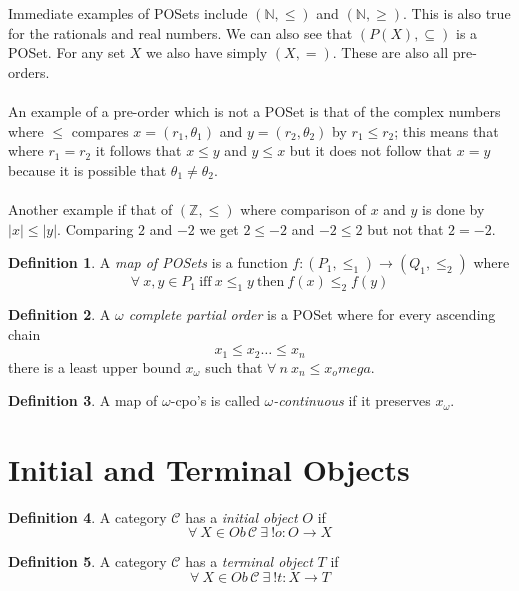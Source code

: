 \documentclass{article}
\theoremstyle{definition}
\newtheorem{definition}{Definition}[section]
\begin{document}
Immediate examples of POSets include $(\mathbb{N},\leq)$ and $(\mathbb{N},\geq)$.
This is also true for the rationals and real numbers.
We can also see that $(P(X), \subseteq)$ is a POSet.
For any set $X$ we also have simply $(X,=)$.
These are also all pre-orders.
\\ \\
An example of a pre-order which is not a POSet is that of the complex numbers
where $\leq$ compares $x = (r_1,\theta_1)$ and $y = (r_2,\theta_2)$ by $r_1 \leq r_2$;
this means that where $r_1 = r_2$ it follows that $x \leq y$ and $y \leq x$
but it does not follow that $x = y$ because it is possible that $\theta_1 \neq \theta_2$.
\\ \\
Another example if that of $(\mathbb{Z},\leq)$ where comparison of $x$ and $y$ is done by
$|x| \leq |y|$.
Comparing $2$ and $-2$ we get $2 \leq -2$ and $-2 \leq 2$ but not that $2 = -2$.

\begin{definition}
	A \textit{map of POSets} is a function $f : (P_1,\leq_1) \rightarrow (Q_1,\leq_2)$ where
	$$\forall\ x,y \in P_1\ \textrm{iff}\ x \leq_1 y\ \textrm{then}\ f(x) \leq_2 f(y)$$
\end{definition}

\begin{definition}
	A \textit{$\omega$ complete partial order} is a POSet where for every ascending chain
	$$x_1 \leq x_2 \dots \leq x_n$$
	there is a least upper bound $x_\omega$ such that $\forall\ n\ x_n \leq x_omega$.
\end{definition}

\begin{definition}
	A map of $\omega$-cpo's is called \textit{$\omega$-continuous}
	if it preserves $x_\omega$.
\end{definition}

\section{Initial and Terminal Objects}

\begin{definition}
	A category $\mathcal{C}$ has a \textit{initial object} $O$ if
	$$\forall\ X \in Ob\,\mathcal{C}\ \exists\ !o : O \rightarrow X$$
\end{definition}

\begin{definition}
	A category $\mathcal{C}$ has a \textit{terminal object} $T$ if
	$$\forall\ X \in Ob\,\mathcal{C}\ \exists\ !t : X \rightarrow T$$
\end{definition}
\end{document}
